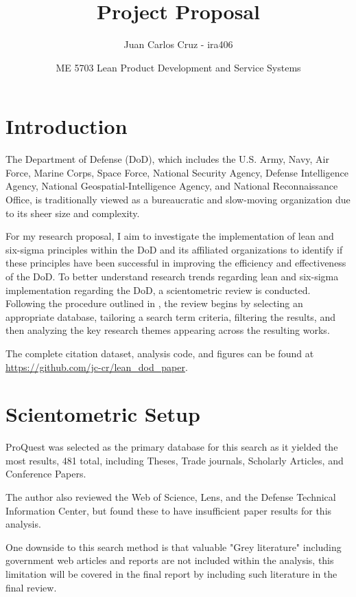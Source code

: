 \documentclass{article}
\title{Project Proposal}
\author{Juan Carlos Cruz - ira406}
\date{ME 5703 Lean Product Development and Service Systems}
\begin{document}
	\maketitle
	\noindent%

	\section{Introduction}

	The Department of Defense (DoD), which includes the U.S. Army, Navy, Air Force, Marine Corps, Space Force, National Security Agency, Defense Intelligence Agency, National Geospatial-Intelligence Agency, and National Reconnaissance Office, is traditionally viewed as a bureaucratic and slow-moving organization due to its sheer size and complexity.

	For my research proposal, I aim to investigate the implementation of lean and six-sigma principles within the DoD and its affiliated organizations to identify if these principles have been successful in improving the efficiency and effectiveness of the DoD.
	To better understand research trends regarding lean and six-sigma implementation regarding the DoD, a scientometric review is conducted.
	Following the procedure outlined in \cite{MA2023104828}, the review begins by selecting an appropriate database, tailoring a search term criteria, filtering the results, and then analyzing the key research themes appearing across the resulting works.

	The complete citation dataset, analysis code, and figures can be found at \url{https://github.com/jc-cr/lean_dod_paper}.


	\section{Scientometric Setup}

	ProQuest was selected as the primary database for this search as it yielded the most results, 481 total, including Theses, Trade journals, Scholarly Articles, and Conference Papers.

	The author also reviewed the Web of Science, Lens, and the Defense Technical Information Center, but found these to have insufficient paper results for this analysis.

	One downside to this search method is that valuable "Grey literature" including government web articles and reports are not included within the analysis, this limitation will be covered in the final report by including such literature in the final review.
\end{document}
